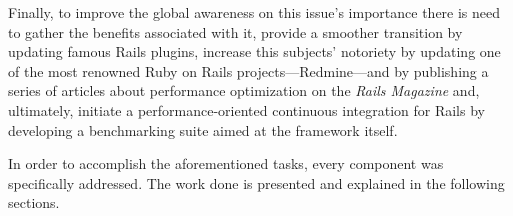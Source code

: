 Finally, to improve the global awareness on this issue's importance there is need to gather the benefits associated with it, provide a smoother transition by updating famous Rails plugins, increase this subjects' notoriety by updating one of the most renowned Ruby on Rails projects---Redmine---and by publishing a series of articles about performance optimization on the \textit{Rails Magazine} and, ultimately, initiate a performance-oriented continuous integration for Rails by developing a benchmarking suite aimed at the framework itself.

In order to accomplish the aforementioned tasks, every component was specifically addressed. The work done is presented and explained in the following sections.







